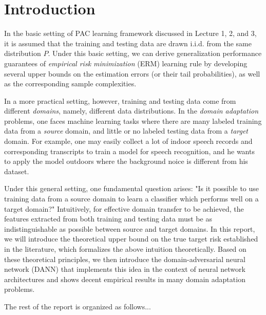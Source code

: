 \section{Introduction}\label{sect:intro}
In the basic setting of PAC learning framework discussed in Lecture 1, 2, and 3, it is assumed that the training and testing data are drawn i.i.d. from the same distribution $P$. Under this basic setting, we can derive generalization performance guarantees of \textit{empirical risk minimization} (ERM) learning rule by developing several upper bounds on the estimation errors (or their tail probabilities), as well as the corresponding sample complexities.

In a more practical setting, however, training and testing data come from different \textit{domains}, namely, different data distributions. In the \textit{domain adaptation} problems, one faces machine learning tasks where there are many labeled training data from a \textit{source} domain, and little or no labeled testing data from a \textit{target} domain. For example, one may easily collect a lot of indoor speech records and corresponding transcripts to train a model for speech recognition, and he wants to apply the model outdoors where the background noice is different from his dataset.

Under this general setting, one fundamental question arises: "Is it possible to use training data from a source domain to learn a classifier which performs well on a target domain?" Intuitively, for effective domain transfer to be achieved, the features extracted from both training and testing data must be as indistinguishable as possible between source and target domains. In this report, we will introduce the theoretical upper bound on the true target risk established in the literature, which formalizes the above intuition theoretically. Based on these theoretical principles, we then introduce the domain-adversarial neural network (DANN) that implements this idea in the context of neural network architectures and shows decent empirical results in many domain adaptation problems.

The rest of the report is organized as follows...

